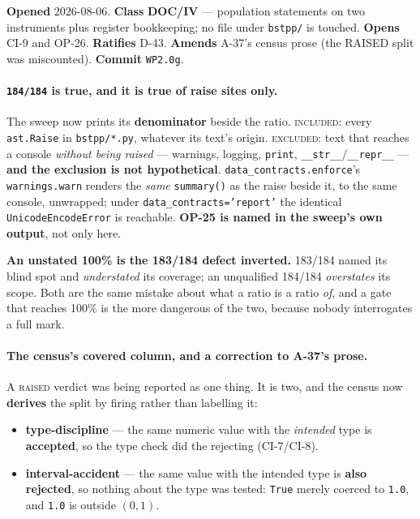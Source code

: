 \documentclass[
  10pt,
]{article}
\providecommand{\tightlist}{%
  \setlength{\itemsep}{0pt}\setlength{\parskip}{0pt}}
\begin{document}
\textbf{Opened} 2026-08-06. \textbf{Class} \textbf{DOC/IV} --- population statements on two instruments plus register bookkeeping; no file under \texttt{bstpp/} is touched. \textbf{Opens} CI-9 and OP-26. \textbf{Ratifies} D-43. \textbf{Amends} A-37's census prose (the RAISED split was miscounted). \textbf{Commit} \texttt{WP2.0g}.

\paragraph{\texttt{184/184} is true, and it is true of raise sites only.}
The sweep now prints its \textbf{denominator} beside the ratio. \textsc{included}: every \texttt{ast.Raise} in \texttt{bstpp/*.py}, whatever its text's origin. \textsc{excluded}: text that reaches a console \emph{without being raised} --- warnings, logging, \texttt{print}, \texttt{\_\_str\_\_}/\texttt{\_\_repr\_\_} --- \textbf{and the exclusion is not hypothetical}. \texttt{data\_contracts.enforce}'s \texttt{warnings.warn} renders the \emph{same} \texttt{summary()} as the raise beside it, to the same console, unwrapped; under \texttt{data\_contracts='report'} the identical \texttt{UnicodeEncodeError} is reachable. \textbf{OP-25 is named in the sweep's own output}, not only here.

\textbf{An unstated 100\% is the 183/184 defect inverted.} 183/184 named its blind spot and \emph{understated} its coverage; an unqualified 184/184 \emph{overstates} its scope. Both are the same mistake about what a ratio is a ratio \emph{of}, and a gate that reaches 100\% is the more dangerous of the two, because nobody interrogates a full mark.

\paragraph{The census's covered column, and a correction to A-37's prose.}
A \textsc{raised} verdict was being reported as one thing. It is two, and the census now \textbf{derives} the split by firing rather than labelling it:

\begin{itemize}
\tightlist
\item \textbf{type-discipline} --- the same numeric value with the \emph{intended} type is \textbf{accepted}, so the type check did the rejecting (CI-7/CI-8).
\item \textbf{interval-accident} --- the same value with the intended type is \textbf{also rejected}, so nothing about the type was tested: \texttt{True} merely coerced to \texttt{1.0}, and \texttt{1.0} is outside \((0,1)\).
\end{itemize}
\end{document}
